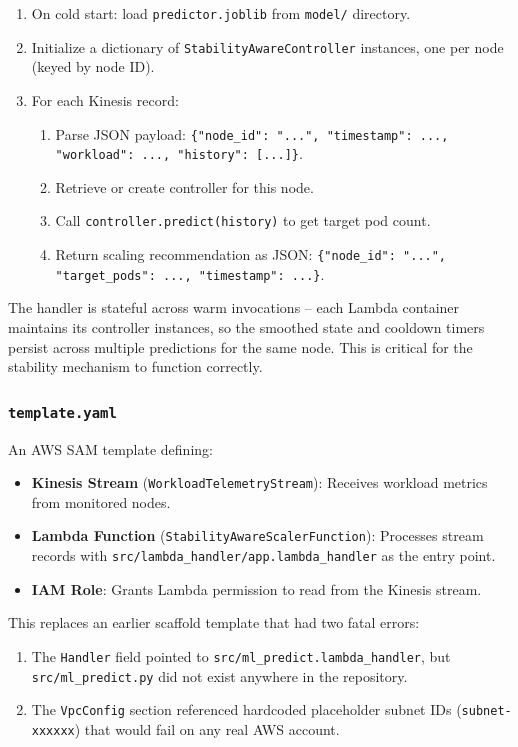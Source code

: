 \begin{enumerate}
  \item On cold start: load \texttt{predictor.joblib} from \texttt{model/} directory.
  \item Initialize a dictionary of \texttt{StabilityAwareController} instances, one per node (keyed by node ID).
  \item For each Kinesis record:
  \begin{enumerate}
    \item Parse JSON payload: \texttt{\{"node\_id": "...", "timestamp": ..., "workload": ..., "history": [...]\}}.
    \item Retrieve or create controller for this node.
    \item Call \texttt{controller.predict(history)} to get target pod count.
    \item Return scaling recommendation as JSON: \texttt{\{"node\_id": "...", "target\_pods": ..., "timestamp": ...\}}.
  \end{enumerate}
\end{enumerate}

The handler is stateful across warm invocations -- each Lambda container maintains its controller instances, so the smoothed state and cooldown timers persist across multiple predictions for the same node. This is critical for the stability mechanism to function correctly.

\subsubsection{\texttt{template.yaml}}

An AWS SAM template defining:
\begin{itemize}
  \item \textbf{Kinesis Stream} (\texttt{WorkloadTelemetryStream}): Receives workload metrics from monitored nodes.
  \item \textbf{Lambda Function} (\texttt{StabilityAwareScalerFunction}): Processes stream records with \texttt{src/lambda\_handler/app.lambda\_handler} as the entry point.
  \item \textbf{IAM Role}: Grants Lambda permission to read from the Kinesis stream.
\end{itemize}

This replaces an earlier scaffold template that had two fatal errors:
\begin{enumerate}
  \item The \texttt{Handler} field pointed to \texttt{src/ml\_predict.lambda\_handler}, but \texttt{src/ml\_predict.py} did not exist anywhere in the repository.
  \item The \texttt{VpcConfig} section referenced hardcoded placeholder subnet IDs (\texttt{subnet-xxxxxx}) that would fail on any real AWS account.
\end{enumerate}

